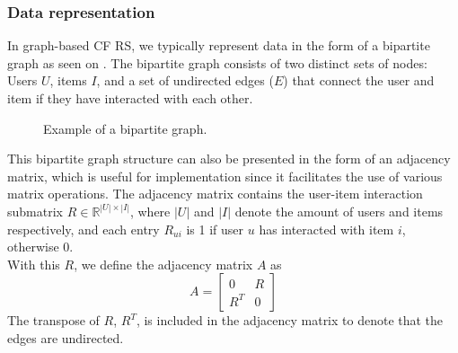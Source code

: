 \subsubsection*{Data representation}
In graph-based CF RS, we typically represent data in the form of a bipartite graph as seen on .
The bipartite graph consists of two distinct sets of nodes: Users $U$, items $I$, and a set of undirected edges ($E$) that connect the user and item if they have interacted with each other.
\begin{figure}[h]
\caption{Example of a bipartite graph.}
\label{fig:bipartite-graph}
\end{figure}
This bipartite graph structure can also be presented in the form of an adjacency matrix, which is useful for implementation since it facilitates the use of various matrix operations.
The adjacency matrix contains the user-item interaction submatrix $R \in \mathbb{R}^{|U| \times |I|}$, where $|U|$ and $|I|$ denote the amount of users and items respectively, and each entry $R_{ui}$ is 1 if user $u$ has interacted with item $i$, otherwise 0.\\
With this $R$, we define the adjacency matrix $A$ as
$$A = \begin{bmatrix} 0 & R\\ R^T & 0 \end{bmatrix}$$
The transpose of $R$, $R^T$, is included in the adjacency matrix to denote that the edges are undirected.

